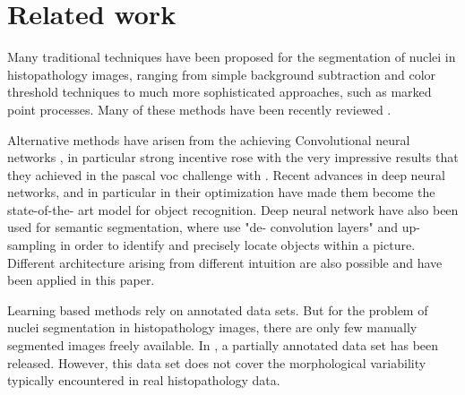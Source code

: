 \documentclass{article}
\begin{document}
\section{Related work}
\label{sec:related}

Many traditional techniques have been proposed for the segmentation of
nuclei in histopathology images, ranging from simple background
subtraction and color threshold techniques\cite{Yuan2012} to much more
sophisticated approaches, such as marked point
processes\cite{Kulikova2012}. Many of these methods have been recently
reviewed \cite{irshad2014methods}.    


Alternative methods 
have arisen from the achieving Convolutional neural networks 
\cite{lecun}, in particular strong incentive rose with the very impressive 
results that they achieved in the pascal voc challenge with 
\cite{ImageNet}. Recent advances in deep neural networks, and in 
particular in their optimization have made them become the state-of-the-
art model for object recognition.  Deep neural network have also been 
used for 
semantic segmentation, where \cite{long2015fcn} use "de-
convolution layers" and up-sampling in order to identify and precisely 
locate objects within a picture. Different architecture arising from 
different intuition are also possible and have been applied in this paper.

Learning based methods rely on annotated data sets. But for the
problem of nuclei segmentation in histopathology images, there are
only few manually segmented images freely available. 
In \cite{Drelie08-298}, a partially annotated data set has been
released. However, this data set does not cover the morphological
variability typically encountered in real histopathology data. 
\end{document}
